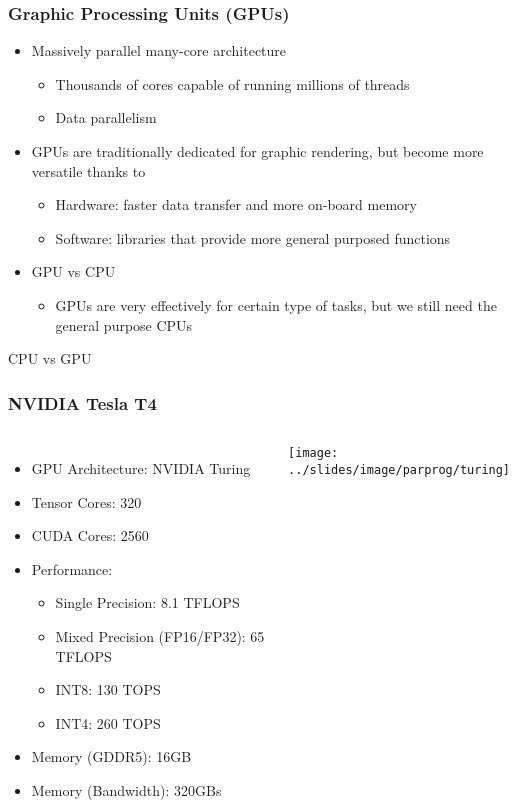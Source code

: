 \documentclass[10pt,t]{beamer}
\begin{document}
\begin{frame}
  \frametitle{Graphic Processing Units (GPUs)}
  \begin{itemize}
  \item Massively parallel many-core architecture
    \begin{itemize}
    \item Thousands of cores capable of running millions of threads
    \item Data parallelism
    \end{itemize}
  \item GPUs are traditionally dedicated for graphic rendering, but
    become more versatile thanks to
    \begin{itemize}
    \item Hardware: faster data transfer and more on-board memory
    \item Software: libraries that provide more general purposed
      functions
    \end{itemize}
  \item GPU vs CPU
    \begin{itemize}
    \item GPUs are very effectively for certain type of tasks, but we still need the general purpose CPUs
    \end{itemize}
  \end{itemize}
\end{frame}

\begin{frame}{CPU vs GPU}
\end{frame}
	
\begin{frame}
  \frametitle{NVIDIA Tesla T4}
  \begin{columns}[c]
    \begin{itemize}
    \item GPU Architecture: NVIDIA Turing
    \item Tensor Cores: 320
    \item CUDA Cores: 2560
    \item Performance: 
      \begin{itemize}
      \item Single Precision: 8.1 TFLOPS
      \item Mixed Precision (FP16/FP32): 65 TFLOPS
      \item INT8: 130 TOPS
      \item INT4: 260 TOPS
      \end{itemize}
    \item Memory (GDDR5): 16GB
    \item Memory (Bandwidth): 320GBs
    \end{itemize}
    \texttt{[image: ../slides/image/parprog/turing]}
  \end{columns}
\end{frame}
\end{document}
